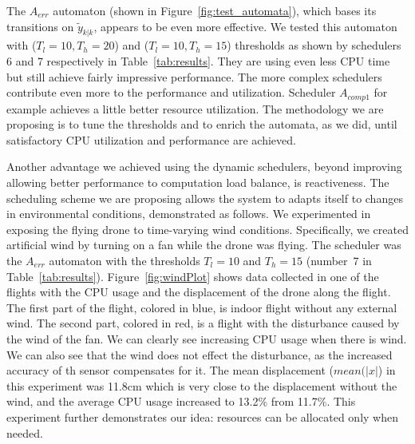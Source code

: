 \documentclass{sig-alternate-ipsn13}
\begin{document}
The $A_{err}$ automaton (shown in Figure~\ref{fig:test_automata}), which bases its transitions on $\tilde{y}_{k|k}$, appears to be even more effective.
We tested this automaton with ($T_l=10 , T_h=20$) and ($T_l=10 , T_h=15$) thresholds as shown by schedulers 6 and 7 respectively in Table~\ref{tab:results}.
They are using even less CPU time but still achieve fairly impressive performance.
The more complex schedulers contribute even more to the performance and utilization. Scheduler $A_{comp1}$ for example achieves a little better resource utilization.
The methodology we are proposing is to tune the thresholds and to enrich the automata, as we did, until satisfactory CPU utilization and performance are achieved.

Another advantage we achieved using the dynamic schedulers, beyond improving allowing better performance to computation load balance, is reactiveness. The  scheduling scheme we are proposing allows the system to adapts itself to changes in environmental conditions, demonstrated as follows.
We experimented in exposing the flying drone to time-varying wind conditions. 
Specifically, we created artificial wind by turning  on a fan while the drone was flying. The scheduler was the $A_{err}$ automaton with the thresholds $T_l=10$ and $T_h=15$ (number~7 in Table~\ref{tab:results}).
Figure~\ref{fig:windPlot} shows data collected in one of the flights with the CPU usage and the displacement of the drone along the flight. The first part of the flight, colored in blue, is indoor flight without any external wind. The second part, colored in red, is a flight with the disturbance caused by the wind of the fan. We can clearly see increasing CPU usage when there is wind. We can also see that the wind does not effect the disturbance, as the increased accuracy of th sensor compensates for it. The mean displacement ($mean(|x|$) in this experiment was 11.8cm which is very close to the displacement without the wind, and the average CPU usage increased to  13.2\% from 11.7\%. This experiment further demonstrates our idea: resources can be allocated only when needed.
\end{document}
